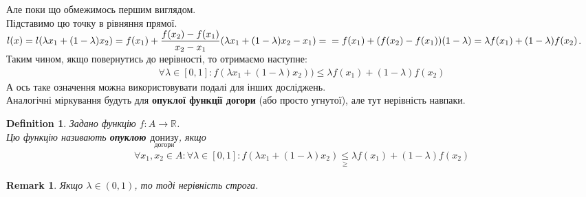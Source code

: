 \documentclass[a4paper, 14pt]{article}
\theoremstyle{theoremdd}
\theoremstyle{theoremdd}
\newtheorem{definition}[theorem]{Definition}
\theoremstyle{theoremdd}
\theoremstyle{theoremdd}
\theoremstyle{theoremdd}
\theoremstyle{theoremdd}
\newtheorem{remark}[theorem]{Remark}
\theoremstyle{theoremdd}
\theoremstyle{theoremdd}
\begin{document}
Але поки що обмежимось першим виглядом.\\
Підставимо цю точку в рівняння прямої.\\
$l(x) = l(\lambda x_1 + (1-\lambda) x_2) = f(x_1) + \dfrac{f(x_2)-f(x_1)}{x_2-x_1} (\lambda x_1 + (1-\lambda)x_2 - x_1) = \\
= f(x_1) + (f(x_2)-f(x_1))(1-\lambda) = \lambda f(x_1) + (1-\lambda)f(x_2)$.\\
Таким чином, якщо повернутись до нерівності, то отримаємо наступне:
\begin{align*}
\forall \lambda \in [0,1]: f(\lambda x_1 + (1-\lambda)x_2)) \leq \lambda f(x_1) + (1-\lambda) f(x_2)
\end{align*}
А ось таке означення можна використовувати подалі для інших досліджень.\\
Аналогічні міркування будуть для \textbf{опуклої функції догори} (або просто угнутої), але тут нерівність навпаки.

\begin{definition}
Задано функцію $f: A \to \mathbb{R}$.\\
Цю функцію називають \textbf{опуклою $\underset{\textrm{догори}}{\textrm{донизу}}$}, якщо
\begin{align*}
\forall x_1,x_2 \in A: \forall \lambda \in [0,1]: f(\lambda x_1 + (1-\lambda)x_2) \underset{\geq}{\leq} \lambda f(x_1) + (1-\lambda)f(x_2)
\end{align*}
\end{definition}

\begin{remark}
Якщо $\lambda \in (0,1)$, то тоді нерівність строга.
\end{remark}
\end{document}
